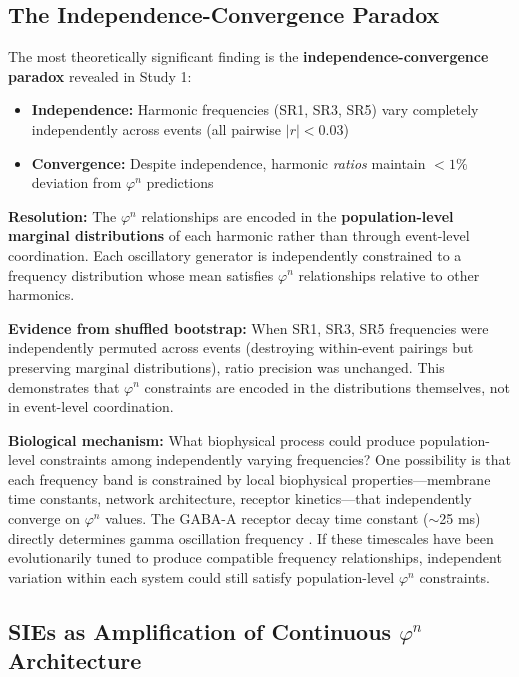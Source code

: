 \documentclass[11pt,a4paper]{article}
\newcommand{\phisym}{\varphi}
\begin{document}
\subsection{The Independence-Convergence Paradox}

The most theoretically significant finding is the \textbf{independence-convergence paradox} revealed in Study 1:

\begin{itemize}
    \item \textbf{Independence:} Harmonic frequencies (SR1, SR3, SR5) vary completely independently across events (all pairwise $|r| < 0.03$)
    \item \textbf{Convergence:} Despite independence, harmonic \textit{ratios} maintain $<1\%$ deviation from $\phisym^n$ predictions
\end{itemize}

\textbf{Resolution:} The $\phisym^n$ relationships are encoded in the \textbf{population-level marginal distributions} of each harmonic rather than through event-level coordination. Each oscillatory generator is independently constrained to a frequency distribution whose mean satisfies $\phisym^n$ relationships relative to other harmonics.

\textbf{Evidence from shuffled bootstrap:} When SR1, SR3, SR5 frequencies were independently permuted across events (destroying within-event pairings but preserving marginal distributions), ratio precision was unchanged. This demonstrates that $\phisym^n$ constraints are encoded in the distributions themselves, not in event-level coordination.

\textbf{Biological mechanism:} What biophysical process could produce population-level constraints among independently varying frequencies? One possibility is that each frequency band is constrained by local biophysical properties---membrane time constants, network architecture, receptor kinetics---that independently converge on $\phisym^n$ values. The GABA-A receptor decay time constant ($\sim$25 ms) directly determines gamma oscillation frequency \parencite{bartos2007synaptic}. If these timescales have been evolutionarily tuned to produce compatible frequency relationships, independent variation within each system could still satisfy population-level $\phisym^n$ constraints.

\subsection{SIEs as Amplification of Continuous $\phisym^n$ Architecture}
\end{document}
